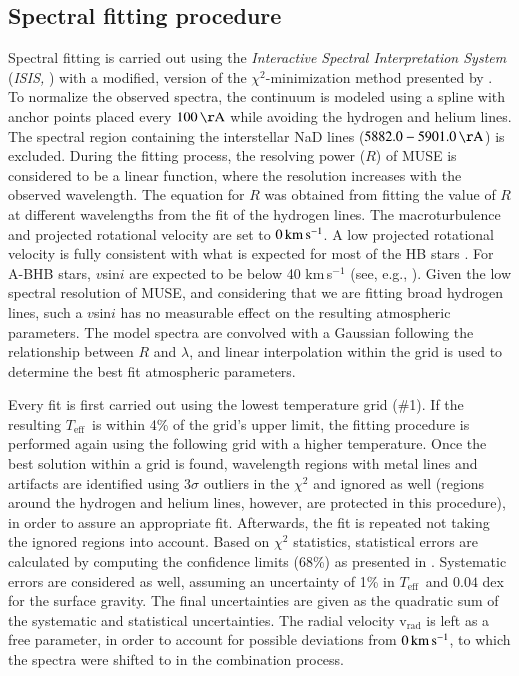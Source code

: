 \documentclass{aa}
\newcommand{\teff}{$T_{\text{eff}}$}
\begin{document}
\subsection{Spectral fitting procedure}\label{subsec:spec_fit}
Spectral fitting is carried out using the \textit{Interactive Spectral Interpretation System} (\textit{ISIS,} \citealt{houck00}) with a modified, version of the $\chi^2$-minimization method presented by \cite{irrgang2014}.
To normalize the observed spectra, the continuum is modeled using a spline with anchor points placed every $100\,\rm\AA$ while avoiding the hydrogen and helium lines.
The spectral region containing the interstellar NaD lines ($5882.0 - 5901.0\,\rm\AA$) is excluded.
During the fitting process, the resolving power ($R$) of MUSE is considered to be a linear function, where the resolution increases with the observed wavelength.
The equation for $R$ was obtained from fitting the value of $R$ at different wavelengths from the fit of the hydrogen lines.
The macroturbulence and projected rotational velocity are set to $0\,\rm km\,s^{-1}$.
A low projected rotational velocity is fully consistent with what is expected for most of the HB stars \citep{geier12,stevenmsc}. For A-BHB stars, $v$sin$i$ are expected to be below 40 km\,s$^{-1}$ (see, e.g., \citealt{behr03}). Given the low spectral resolution of MUSE, and considering that we are fitting broad hydrogen lines, such a $v$sin$i$ has no measurable effect on the resulting atmospheric parameters.
The model spectra are convolved with a Gaussian following the relationship between $R$ and $\lambda$, and linear interpolation within the grid is used to determine the best fit atmospheric parameters.

Every fit is first carried out using the lowest temperature grid (\#1).
If the resulting \teff\ is within 4\% of the grid's upper limit, the fitting procedure is performed again using the following grid with a higher temperature.
Once the best solution within a grid is found, wavelength regions with metal lines and artifacts are identified using $3\sigma$ outliers in the $\chi^2$ and ignored as well (regions around the hydrogen and helium lines, however, are protected in this procedure), in order to assure an appropriate fit. Afterwards, the fit is repeated not taking the ignored regions into account.
Based on $\chi^2$ statistics, statistical errors are calculated by computing the confidence limits (68\%) as presented in \citet{irrgang2014}.
Systematic errors are considered as well, assuming an uncertainty of 1\% in \teff\ and $0.04$ dex for the surface gravity.
The final uncertainties are given as the quadratic sum of the systematic and statistical uncertainties.
The radial velocity $\mathrm{v}_\mathrm{rad}$ is left as a free parameter, in order to account for possible deviations from $0\,\rm km\,s^{-1}$, to which the spectra were shifted to in the combination process.
\end{document}
